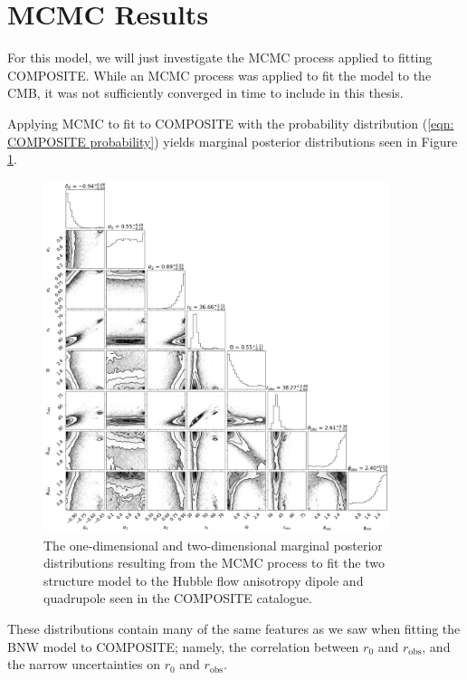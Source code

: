 \documentclass[a4paper,12pt]{report}
\begin{document}
\section{MCMC Results}\label{section: two_structures COMPOSITE MCMC}
For this model, we will just investigate the MCMC process applied to fitting COMPOSITE. While an MCMC process was applied to fit the model to the CMB, it was not sufficiently converged in time to include in this thesis.

Applying MCMC to fit to COMPOSITE with the probability distribution (\ref{eqn: COMPOSITE probability}) yields marginal posterior distributions seen in Figure \ref{fig: two_structures Hubble expansion dip and quad MCMC corner}.

\begin{figure}[!tb]
    \centering
    \includegraphics[width=0.9\textwidth]{two structures/COMP only MCMC/corner plot.png}
    \caption{The one-dimensional and two-dimensional marginal posterior distributions resulting from the MCMC process to fit the two structure model to the Hubble flow anisotropy dipole and quadrupole seen in the COMPOSITE catalogue.}
    \label{fig: two_structures Hubble expansion dip and quad MCMC corner}
\end{figure}

These distributions contain many of the same features as we saw when fitting the BNW model to COMPOSITE; namely, the correlation between $r_0$ and $r_\text{obs}$, and the narrow uncertainties on $r_0$ and $r_\text{obs}$.
\end{document}
